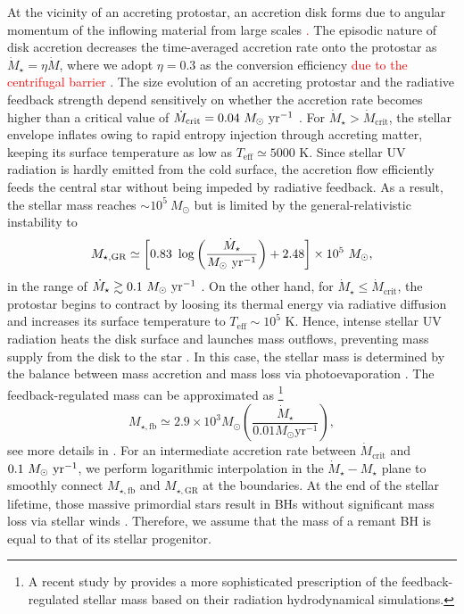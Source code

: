 \documentclass[twocolumn, twocolappendix]{aastex63}
\newcommand{\Msun}{M_\odot}
\newcommand{\Msunyr}{M_\odot~{\rm yr}^{-1}}
\newcommand{\Mdot}{\dot{M}}
\newcommand{\red}[1]{\textcolor{red}{ #1}}
\newcommand{\blue}[1]{\textcolor{blue}{ #1}}
\begin{document}
\begin{CJK*}{UTF8}{gbsn}
At the vicinity of an accreting protostar, an accretion disk forms due to angular momentum of the inflowing material from large scales
\red{
\citep{2010MNRAS.403...45S,2011Sci...331.1040C,2011ApJ...737...75G}.
}
The episodic nature of disk accretion decreases the time-averaged accretion rate onto the protostar as $\Mdot_{\star}=\eta \Mdot$, 
where we adopt $\eta=0.3$ as the conversion efficiency \red{due to the centrifugal barrier} \citep{2016MNRAS.459.1137S, 2022arXiv220614459T}. 
The size evolution of an accreting protostar and the radiative feedback strength depend sensitively on whether
the accretion rate becomes higher than a critical value of $\dot{M}_{\mathrm{crit}}=0.04~\Msunyr$ 
\citep{2001ApJ...561L..55O,2013ApJ...778..178H,2013A&A...558A..59S,2015MNRAS.452..755S,2018MNRAS.474.2757H}.
For $\dot{M}_\star > \Mdot_\mathrm{crit}$, the stellar envelope inflates owing to rapid entropy injection through accreting matter,
keeping its surface temperature as low as $T_\mathrm{eff} \simeq 5000$ K. 
Since stellar UV radiation is hardly emitted from the cold surface, the accretion flow efficiently feeds the central star without being 
impeded by radiative feedback.
As a result, the stellar mass reaches $\sim 10^5~\Msun$ but is limited by the general-relativistic instability to
%
\begin{equation}
 M_{\star, \mathrm{GR}} \simeq\left[0.83~\log \left(\frac{\dot{M}_{\star}}{\Msunyr}\right)+2.48\right] \times 10^{5} ~\Msun,
\end{equation}
%
in the range of $\dot{M}_\star\gtrsim 0.1~\Msunyr$ \citep{2016PhRvD..94b1501S,2017ApJ...842L...6W,2019PASA...36...27W}.
On the other hand, for $\dot{M}_\star \leq \Mdot_\mathrm{crit}$, the protostar begins to contract by loosing its thermal energy via radiative diffusion
and increases its surface temperature to $T_\mathrm{eff} \sim 10^5$ K.
Hence, intense stellar UV radiation heats the disk surface and launches mass outflows, preventing mass supply from the disk to the star
\citep{2008ApJ...681..771M,2011Sci...334.1250H}. 
In this case, the stellar mass is determined by the balance between mass accretion and mass loss via photoevaporation \citep{2013ApJ...773..155T}.
The feedback-regulated mass can be approximated as
\footnote[2]{A recent study by \citet{2022arXiv220614459T} provides a more sophisticated prescription of the feedback-regulated stellar mass based on their radiation hydrodynamical simulations.}
%
\begin{equation}
M_{\star, \mathrm{fb}} \simeq 2.9 \times 10^{3} \Msun\left(\frac{\dot{M}_{\star}}{0.01 M_{\odot} \mathrm{yr}^{-1}}\right),
\end{equation}
%
see more details in \cite{2021ApJ...917...60L}.
For an intermediate accretion rate between $\Mdot_\mathrm{crit}$ and $0.1~\Msunyr$, 
we perform logarithmic interpolation in the $\Mdot_\star - M_\star$ plane to smoothly connect 
$M_{\star, \mathrm{fb}}$ and $M_{\star, \mathrm{GR}}$ at the boundaries.
At the end of the stellar lifetime, those massive primordial stars result in BHs without significant mass loss 
via stellar winds \citep{2003ApJ...591..288H,2015MNRAS.451.4086S}.
Therefore, we assume that the mass of a remant BH is equal to that of its stellar progenitor.



\end{CJK*}
\end{document}
